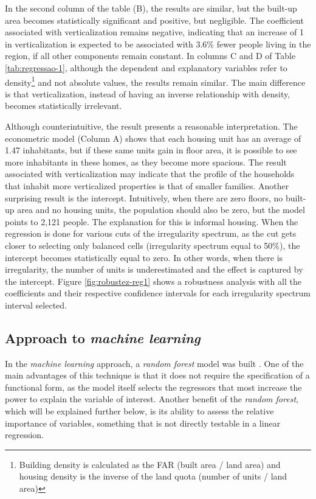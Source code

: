 In the second column of the table (B), the results are similar, but the built-up area becomes statistically significant and positive, but negligible. The coefficient associated with verticalization remains negative, indicating that an increase of 1 in verticalization is expected to be associated with 3.6\% fewer people living in the region, if all other components remain constant. In columns C and D of Table \ref{tab:regressao-1}, although the dependent and explanatory variables refer to density\footnote{Building density is calculated as the FAR (built area / land area) and housing density is the inverse of the land quota (number of units / land area)} and not absolute values, the results remain similar. The main difference is that verticalization, instead of having an inverse relationship with density, becomes statistically irrelevant.

Although counterintuitive, the result presents a reasonable interpretation. The econometric model (Column A) shows that each housing unit has an average of 1.47 inhabitants, but if these same units gain in floor area, it is possible to see more inhabitants in these homes, as they become more spacious. The result associated with verticalization may indicate that the profile of the households that inhabit more verticalized properties is that of smaller families. Another surprising result is the intercept. Intuitively, when there are zero floors, no built-up area and no housing units, the population should also be zero, but the model points to 2,121 people. The explanation for this is informal housing. When the regression is done for various cuts of the irregularity spectrum, as the cut gets closer to selecting only balanced cells (irregularity spectrum equal to 50\%), the intercept becomes statistically equal to zero. In other words, when there is irregularity, the number of units is underestimated and the effect is captured by the intercept. Figure \ref{fig:robustez-reg1} shows a robustness analysis with all the coefficients and their respective confidence intervals for each irregularity spectrum interval selected.

\subsection{Approach to \textit{machine learning}}
\label{subsec:randfor}

In the \textit{machine learning} approach, a \textit{random forest} model was built \cite{wright2015ranger}. One of the main advantages of this technique is that it does not require the specification of a functional form, as the model itself selects the regressors that most increase the power to explain the variable of interest. Another benefit of the \textit{random forest}, which will be explained further below, is its ability to assess the relative importance of variables, something that is not directly testable in a linear regression.


